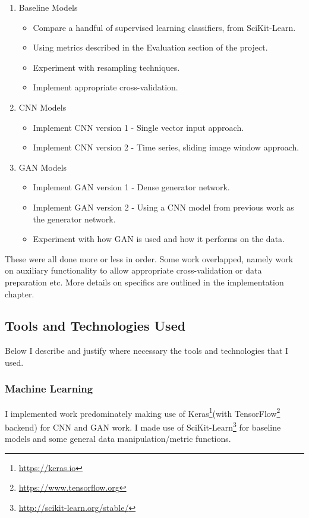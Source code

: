 \documentclass[12pt,a4paper,twoside]{report}
\begin{document}
\begin{enumerate}
   \item Baseline Models
   \begin{itemize}
     \item Compare a handful of supervised learning classifiers, from SciKit-Learn.
     \item Using metrics described in the Evaluation section of the project.
     \item Experiment with resampling techniques. 
     \item Implement appropriate cross-validation.
   \end{itemize}
   \item CNN Models
   \begin{itemize}
     \item Implement CNN version 1 - Single vector input approach.
     \item Implement CNN version 2 - Time series, sliding image window approach.
   \end{itemize}
   \item GAN Models
   \begin{itemize}
     \item Implement GAN version 1 - Dense generator network.
     \item Implement GAN version 2 - Using a CNN model from previous work as the generator network.
     \item Experiment with how GAN is used and how it performs on the data.
   \end{itemize}
\end{enumerate}

 These were all done more or less in order. Some work overlapped, namely work on auxiliary functionality to allow appropriate cross-validation or data preparation etc. More details on specifics are outlined in the implementation chapter. 
  
\subsection{Tools and Technologies Used} \label{tools}

Below I describe and justify where necessary the tools and technologies that I used.

\subsubsection{Machine Learning}

I implemented work predominately making use of Keras\footnote{\href{https://keras.io}{https://keras.io}}(with TensorFlow\footnote{\href{https://www.tensorflow.org}{https://www.tensorflow.org}} backend) for CNN and GAN work. I made use of SciKit-Learn\footnote{\href{ http://scikit-learn.org/stable/}{ http://scikit-learn.org/stable/}} for baseline models and some general data manipulation/metric functions. 
\end{document}
